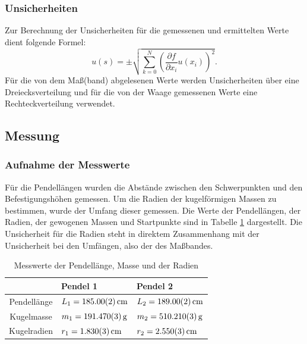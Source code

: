		\subsubsection{Unsicherheiten}
		
			Zur Berechnung der Unsicherheiten für die gemessenen und ermittelten Werte dient folgende Formel: 
			\begin{equation*}
				u(s) = \pm \sqrt{\sum_{k=0}^{N}\left( \frac{\partial f}{\partial x_i}u(x_i)\right) ^2}. \label{eq:kombUnsicherheit}
			\end{equation*}
			Für die von dem Maß(band) abgelesenen Werte werden Unsicherheiten über eine Dreiecksverteilung und für die von der Waage gemessenen Werte eine Rechteckverteilung verwendet. 
	
	\subsection{Messung}
	
		\subsubsection{Aufnahme der Messwerte}
		
			Für die Pendellängen wurden die Abstände zwischen den Schwerpunkten und den Befestigungshöhen gemessen. 
			Um die Radien der kugelförmigen Massen zu bestimmen, wurde der Umfang dieser gemessen. Die Werte der Pendellängen, der Radien, der gewogenen Massen und Startpunkte sind in Tabelle \ref{tab:Messwerte} dargestellt. Die Unsicherheit für die Radien steht in direktem Zusammenhang mit der Unsicherheit bei den Umfängen, also der des Maßbandes.
			\begin{table}[ht]
				\caption{Messwerte der Pendellänge, Masse und der Radien}
				\centering
				\label{tab:Messwerte}
				\begin{tabular}{c|l|l}
					{} & {Pendel 1} & {Pendel 2}	\\
					\hline
					{Pendellänge} & {$L_1 = \SI{185+-0,02}{\cm}$} & {$L_2 = \SI{189+-0,02}{\cm}$}	\\
					\hline
					{Kugelmasse} & {$m_1 = \SI{191,47+-0,003}{\g}$} & {$m_2 = \SI{510,21+-0,003}{\g}$}	\\	
					\hline
					{Kugelradien} & {$r_1 = \SI{1,83+-0,003}{\cm}$} & {$r_2 = \SI{2,55+-0,003}{\cm}$}	\\			
				\end{tabular}
			\end{table}
			
